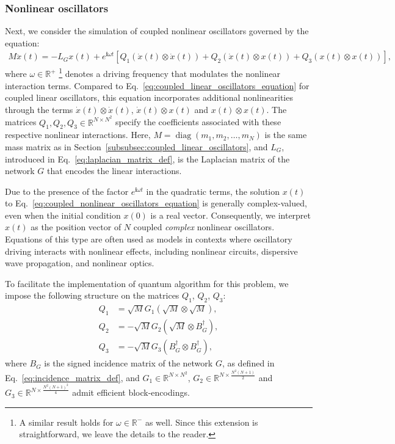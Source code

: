\documentclass[superscriptaddress,onecolumn,nofootinbib,longbibliography,a4paper,accepted=2026-09-29]{quantumarticle}
\theoremstyle{plain}
\theoremstyle{definition}
\numberwithin{thm}{section}
\numberwithin{assumption}{section}
\numberwithin{lemma}{section}
\numberwithin{prop}{section}
\numberwithin{cor}{section}
\numberwithin{definition}{section}
\numberwithin{rmk}{section}
\numberwithin{equation}{section}
\newcommand{\R}{\mathbb{R}}
\newcommand{\lrb}[1]{\left ( #1 \right )}
\newcommand{\lrsb}[1]{\left [ #1 \right ]}
\renewcommand{\i}{\ensuremath{\mathbf{i}}}
\newcommand{\diag}[1]{\operatorname{diag}\lrb{#1}}
\begin{document}
\subsubsection{Nonlinear oscillators}
\label{subsubsec:coupled_nonlinear_oscillators}

Next, we consider the simulation of coupled nonlinear oscillators governed by the equation:
\begin{align}
M\ddot{x}(t) = -L_G x(t)+ e^{\i \omega t}\lrsb{Q_1 (\dot{x}(t) \otimes \dot{x}(t)) + Q_2 (\dot{x}(t) \otimes x(t)) + Q_3 (x(t)\otimes x(t))
},
\label{eq:coupled_nonlinear_oscillators_equation}
\end{align}
where $\omega \in \R^+$ \footnote{A similar result holds for $\omega \in \R^-$ as well. Since this extension is straightforward, we leave the details to the reader.} denotes a driving frequency that modulates the nonlinear interaction terms. Compared to Eq.~\eqref{eq:coupled_linear_oscillators_equation} for coupled linear oscillators, this equation incorporates additional nonlinearities through the terms $\dot{x}(t)\otimes \dot{x}(t)$, $\dot{x}(t)\otimes x(t)$ and $x(t)\otimes x(t)$. The matrices $Q_1, Q_2, Q_3 \in \R^{N \times N^2}$ specify the coefficients associated with these respective nonlinear interactions. Here,  $M=\diag{m_1,m_2,\dots,m_N}$ is the same mass matrix as in Section~\ref{subsubsec:coupled_linear_oscillators}, and $L_G$, introduced in Eq.~\eqref{eq:laplacian_matrix_def}, is the Laplacian matrix of the network $G$ that encodes the linear interactions.

Due to the presence of the factor $e^{\i \omega t}$ in the quadratic terms, the solution $x(t)$ to Eq.~\eqref{eq:coupled_nonlinear_oscillators_equation} is generally complex-valued, even when the initial condition $x(0)$ is a real vector. Consequently, we interpret $x(t)$ as the position vector of $N$ coupled \emph{complex} nonlinear oscillators. Equations of this type are often used as models in contexts where oscillatory driving interacts with nonlinear effects, including nonlinear circuits, dispersive wave propagation, and nonlinear optics.

To facilitate the implementation of quantum algorithm for this problem, we impose the following structure on the matrices $Q_1$, $Q_2$, $Q_3$:
\begin{align}
Q_1 &= \sqrt{M} G_1 \lrb{\sqrt{M}\otimes \sqrt{M}},
\label{eq:def_q1}\\
Q_2 &= -\sqrt{M} G_2 \lrb{\sqrt{M} \otimes B_G^\dagger}, 
\label{eq:def_q2} \\
Q_3 &= -\sqrt{M} G_3 \lrb{B_G^\dagger \otimes B_G^\dagger}, 
\label{eq:def_q3}
\end{align}
where $B_G$ is the signed incidence matrix of the network $G$, as defined in Eq.~\eqref{eq:incidence_matrix_def}, and
$G_1 \in \R^{N \times N^2}$, $G_2 \in \R^{N \times \frac{N^2(N+1)}{2}}$ and
$G_3 \in \R^{N \times \frac{N^2(N+1)^2}{4}}$ admit efficient block-encodings.
\end{document}
